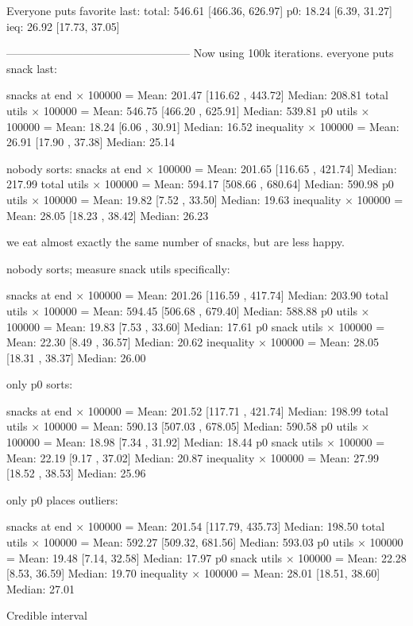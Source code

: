 \documentclass[twocolumn]{article}
\begin{document}
Everyone puts favorite last:
total: 546.61 [466.36, 626.97]
p0: 18.24 [6.39, 31.27]
ieq: 26.92 [17.73, 37.05]


--------------------------------------------------
Now using 100k iterations. everyone puts snack last:

snacks at end × 100000 = Mean: 201.47 [116.62 , 443.72] Median: 208.81
total utils × 100000 = Mean: 546.75 [466.20 , 625.91] Median: 539.81
p0 utils × 100000 = Mean: 18.24 [6.06 , 30.91] Median: 16.52
inequality × 100000 = Mean: 26.91 [17.90 , 37.38] Median: 25.14

nobody sorts:
snacks at end × 100000 = Mean: 201.65 [116.65 , 421.74] Median: 217.99
total utils × 100000 = Mean: 594.17 [508.66 , 680.64] Median: 590.98
p0 utils × 100000 = Mean: 19.82 [7.52 , 33.50] Median: 19.63
inequality × 100000 = Mean: 28.05 [18.23 , 38.42] Median: 26.23

we eat almost exactly the same number of snacks, but are less happy.


nobody sorts; measure snack utils specifically:

snacks at end × 100000 = Mean: 201.26 [116.59 , 417.74] Median: 203.90
total utils × 100000 = Mean: 594.45 [506.68 , 679.40] Median: 588.88
p0 utils × 100000 = Mean: 19.83 [7.53 , 33.60] Median: 17.61
p0 snack utils × 100000 = Mean: 22.30 [8.49 , 36.57] Median: 20.62
inequality × 100000 = Mean: 28.05 [18.31 , 38.37] Median: 26.00

only p0 sorts:

snacks at end × 100000 = Mean: 201.52 [117.71 , 421.74] Median: 198.99
total utils × 100000 = Mean: 590.13 [507.03 , 678.05] Median: 590.58
p0 utils × 100000 = Mean: 18.98 [7.34 , 31.92] Median: 18.44
p0 snack utils × 100000 = Mean: 22.19 [9.17 , 37.02] Median: 20.87
inequality × 100000 = Mean: 27.99 [18.52 , 38.53] Median: 25.96

only p0 places outliers:

snacks at end × 100000 = Mean: 201.54 [117.79, 435.73] Median: 198.50
total utils × 100000 = Mean: 592.27 [509.32, 681.56] Median: 593.03
p0 utils × 100000 = Mean: 19.48 [7.14, 32.58] Median: 17.97
p0 snack utils × 100000 = Mean: 22.28 [8.53, 36.59] Median: 19.70
inequality × 100000 = Mean: 28.01 [18.51, 38.60] Median: 27.01



Credible interval\cite{kruschke2014doing}



\end{document}
